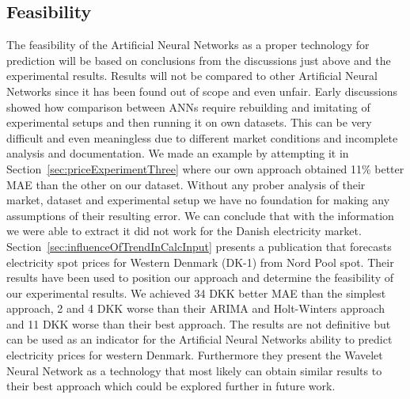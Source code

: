 \subsection{Feasibility}
The feasibility of the Artificial Neural Networks as a proper technology for prediction will be based on conclusions from the discussions just above and the experimental results. Results will not be compared to other Artificial Neural Networks since it has been found out of scope and even unfair. Early discussions showed how comparison between ANNs require rebuilding and imitating of experimental setups and then running it on own datasets. This can be very difficult and even meaningless due to different market conditions and incomplete analysis and documentation. We made an example by attempting it in Section~\ref{sec:priceExperimentThree} where our own approach obtained 11\% better MAE than the other on our dataset. Without any prober analysis of their market, dataset and experimental setup we have no foundation for making any assumptions of their resulting error. We can conclude that with the information we were able to extract it did not work for the Danish electricity market. Section~\ref{sec:influenceOfTrendInCalcInput} presents a publication that forecasts electricity spot prices for Western Denmark (DK-1) from Nord Pool spot. Their results have been used to position our approach and determine the feasibility of our experimental results. We achieved 34 DKK better MAE than the simplest approach, 2 and 4 DKK worse than their ARIMA and Holt-Winters approach and 11 DKK worse than their best approach. The results are not definitive but can be used as an indicator for the Artificial Neural Networks ability to predict electricity prices for western Denmark. Furthermore they present the Wavelet Neural Network as a technology that most likely can obtain similar results to their best approach which could be explored further in future work.

